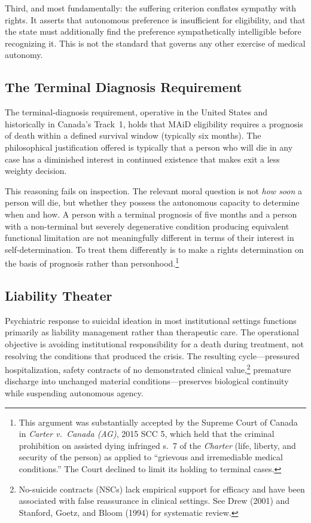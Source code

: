 \documentclass[11pt, letterpaper]{article}
\begin{document}
Third, and most fundamentally: the suffering criterion conflates sympathy with rights.
It asserts that autonomous preference is insufficient for eligibility, and that the
state must additionally find the preference sympathetically intelligible before
recognizing it. This is not the standard that governs any other exercise of medical
autonomy.

\subsection{The Terminal Diagnosis Requirement}

The terminal-diagnosis requirement, operative in the United States and historically
in Canada's Track~1, holds that MAiD eligibility requires a prognosis of death within
a defined survival window (typically six months). The philosophical justification
offered is typically that a person who will die in any case has a diminished interest
in continued existence that makes exit a less weighty decision.

This reasoning fails on inspection. The relevant moral question is not \textit{how soon}
a person will die, but whether they possess the autonomous capacity to determine when
and how. A person with a terminal prognosis of five months and a person with a
non-terminal but severely degenerative condition producing equivalent functional
limitation are not meaningfully different in terms of their interest in self-determination.
To treat them differently is to make a rights determination on the basis of prognosis
rather than personhood.\footnote{%
  This argument was substantially accepted by the Supreme Court of Canada in
  \textit{Carter v.\ Canada (AG)}, 2015 SCC 5, which held that the criminal prohibition
  on assisted dying infringed s.\ 7 of the \textit{Charter} (life, liberty, and
  security of the person) as applied to ``grievous and irremediable medical conditions.''
  The Court declined to limit its holding to terminal cases.}

\subsection{Liability Theater}

Psychiatric response to suicidal ideation in most institutional settings functions
primarily as liability management rather than therapeutic care. The operational
objective is avoiding institutional responsibility for a death during treatment, not
resolving the conditions that produced the crisis. The resulting cycle---pressured
hospitalization, safety contracts of no demonstrated clinical value,\footnote{%
  No-suicide contracts (NSCs) lack empirical support for efficacy and have been
  associated with false reassurance in clinical settings. See Drew (2001) and
  Stanford, Goetz, and Bloom (1994) for systematic review.}
premature discharge into unchanged material conditions---preserves biological
continuity while suspending autonomous agency.
\end{document}
